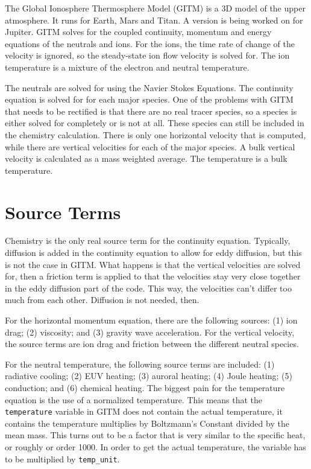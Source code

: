 
The Global Ionosphere Thermosphere Model (GITM) is a 3D model of the
upper atmosphere.  It runs for Earth, Mars and Titan.  A version is
being worked on for Jupiter.  GITM solves for the coupled continuity,
momentum and energy equations of the neutrals and ions.  For the ions,
the time rate of change of the velocity is ignored, so the
steady-state ion flow velocity is solved for.  The ion temperature is
a mixture of the electron and neutral temperature.

The neutrals are solved for using the Navier Stokes Equations.  The
continuity equation is solved for for each major species.  One of the
problems with GITM that needs to be rectified is that there are no
real tracer species, so a species is either solved for completely or
is not at all.  These species can still be included in the chemistry
calculation.  There is only one horizontal velocity that is computed,
while there are vertical velocities for each of the major species.  A
bulk vertical velocity is calculated as a mass weighted average.  The
temperature is a bulk temperature.

\section{Source Terms}

Chemistry is the only real source term for the continuity equation.
Typically, diffusion is added in the continuity equation to allow for
eddy diffusion, but this is not the case in GITM.  What happens is
that the vertical velocities are solved for, then a friction term is
applied to that the velocities stay very close together in the eddy
diffusion part of the code.  This way, the velocities can't differ too
much from each other.  Diffusion is not needed, then.

For the horizontal momentum equation, there are the following sources:
(1) ion drag; (2) viscosity; and (3) gravity wave acceleration.  For
the vertical velocity, the source terms are ion drag and friction
between the different neutral species.

For the neutral temperature, the following source terms are included:
(1) radiative cooling; (2) EUV heating; (3) auroral heating; (4) Joule
heating; (5) conduction; and (6) chemical heating.  The biggest pain
for the temperature equation is the use of a normalized temperature.
This means that the {\tt temperature} variable in GITM does not
contain the actual temperature, it contains the temperature multiplies
by Boltzmann's Constant divided by the mean mass.  This turns out to
be a factor that is very similar to the specific heat, or roughly or
order 1000.  In order to get the actual temperature, the variable has
to be multiplied by {\tt temp\_unit}.

